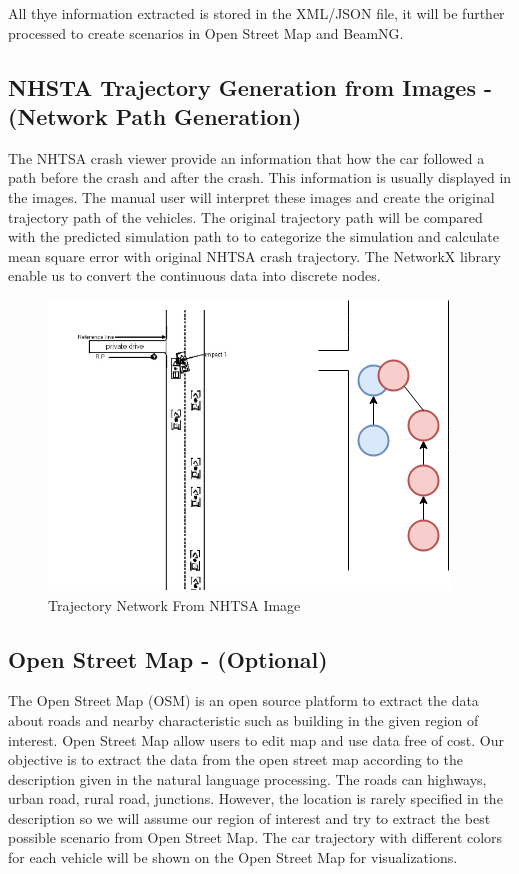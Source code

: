 All thye information extracted is stored in the XML/JSON file, it will be further processed to create scenarios in Open Street Map and BeamNG. 

\subsection{NHSTA Trajectory Generation from Images - (Network Path Generation)}
The NHTSA crash viewer provide an information that how the car followed a path before the crash and after the crash. This information is usually displayed in the images. The manual user will interpret these images and create the original trajectory path of the vehicles. The original trajectory path will be compared with the predicted simulation path to to categorize the simulation and calculate mean square error with original NHTSA crash trajectory. The NetworkX \cite{SciPyProceedings_11} library enable us to convert the continuous data into discrete nodes.      

\begin{figure}[H]
\centering
  \includegraphics[scale= 0.4]{pictures/SO1_NET.png}
  \caption{Trajectory Network From NHTSA Image}
\end{figure}

\subsection{Open Street Map - (Optional)}
The Open Street Map (OSM) is an open source platform to extract the data about roads and nearby characteristic such as building in the given region of interest. Open Street Map allow users to edit map and use data free of cost. Our objective is to extract the data from the open street map according to the description given in the natural language processing. The roads can highways, urban road, rural road, junctions. However, the location is rarely specified in the description so we will assume our region of interest and try to extract the best possible scenario from Open Street Map. The car trajectory with different colors for each vehicle will be shown on the Open Street Map for visualizations. 

